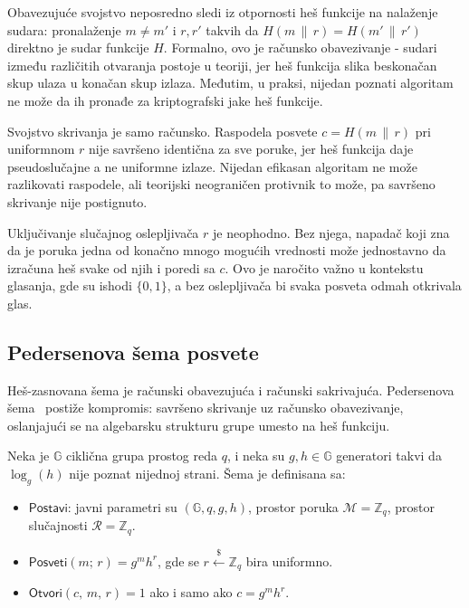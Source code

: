Obavezujuće svojstvo neposredno sledi iz otpornosti heš funkcije na nalaženje sudara:
pronalaženje $m \neq m'$ i $r, r'$ takvih da $H(m \,\|\, r) = H(m' \,\|\, r')$ direktno
je sudar funkcije $H$. Formalno, ovo je računsko obavezivanje - sudari između različitih
otvaranja postoje u teoriji, jer heš funkcija slika beskonačan skup ulaza u konačan skup
izlaza. Međutim, u praksi, nijedan poznati algoritam ne može da ih pronađe za kriptografski
jake heš funkcije.

Svojstvo skrivanja je samo računsko. Raspodela posvete $c = H(m \,\|\, r)$ pri uniformnom
$r$ nije savršeno identična za sve poruke, jer heš funkcija daje pseudoslučajne a ne
uniformne izlaze. Nijedan efikasan algoritam ne može razlikovati raspodele, ali teorijski
neograničen protivnik to može, pa savršeno skrivanje nije postignuto.

\begin{remark}
\label{rem:blinding-factor}
Uključivanje slučajnog oslepljivača $r$ je neophodno. Bez njega, napadač koji zna da je
poruka jedna od konačno mnogo mogućih vrednosti može jednostavno da izračuna heš svake od
njih i poredi sa $c$. Ovo je naročito važno u kontekstu glasanja, gde su ishodi $\{0, 1\}$,
a bez oslepljivača bi svaka posveta odmah otkrivala glas.
\end{remark}

\subsection{Pedersenova šema posvete}
\label{subsec:pedersen-commitment}

Heš-zasnovana šema je računski obavezujuća i računski sakrivajuća.
Pedersenova šema~\cite{pedersen1991non} postiže kompromis: savršeno skrivanje uz
računsko obavezivanje, oslanjajući se na algebarsku strukturu grupe umesto na heš funkciju.

\begin{definition}
\label{def:pedersen-commitment}
Neka je $\mathbb{G}$ ciklična grupa prostog reda $q$, i neka su $g, h \in \mathbb{G}$
generatori takvi da $\log_g(h)$ nije poznat nijednoj strani. Šema je definisana sa:
\begin{itemize}
  \item $\mathsf{Postavi}$: javni parametri su $(\mathbb{G}, q, g, h)$,
    prostor poruka $\mathcal{M} = \mathbb{Z}_q$, prostor slučajnosti $\mathcal{R} = \mathbb{Z}_q$.
  \item $\mathsf{Posveti}(m;\, r) = g^m h^r$, gde se $r \xleftarrow{\$} \mathbb{Z}_q$ bira uniformno.
  \item $\mathsf{Otvori}(c,\, m,\, r) = 1$ ako i samo ako $c = g^m h^r$.
\end{itemize}
\end{definition}

